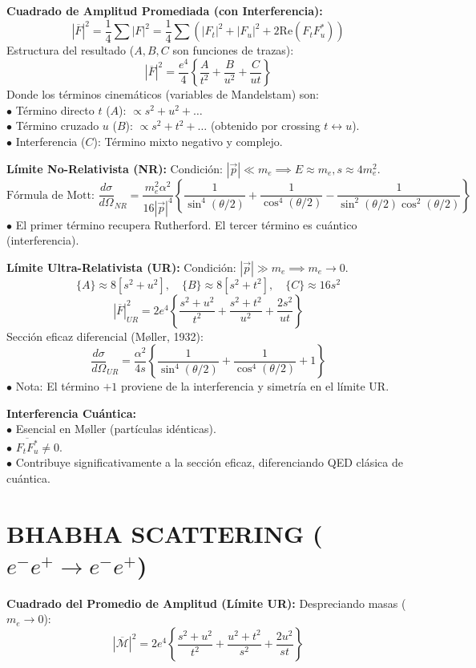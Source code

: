 \textbf{Cuadrado de Amplitud Promediada (con Interferencia):}
$$ |\overline{F}|^2 = \frac{1}{4} \sum |F|^2 = \frac{1}{4} \sum (|F_t|^2 + |F_u|^2 + 2\text{Re}(F_t F_u^*)) $$
Estructura del resultado ($A, B, C$ son funciones de trazas):
$$ |\overline{F}|^2 = \frac{e^4}{4} \left\{ \frac{A}{t^2} + \frac{B}{u^2} + \frac{C}{ut} \right\} $$
Donde los términos cinemáticos (variables de Mandelstam) son:\\
$\bullet$ Término directo $t$ ($A$): $\propto s^2 + u^2 + \dots$\\
$\bullet$ Término cruzado $u$ ($B$): $\propto s^2 + t^2 + \dots$ (obtenido por crossing $t \leftrightarrow u$).\\
$\bullet$ Interferencia ($C$): Término mixto negativo y complejo.

\textbf{Límite No-Relativista (NR):}
Condición: $|\vec{p}| \ll m_e \implies E \approx m_e, s \approx 4m_e^2$.
$$ \text{Fórmula de Mott: }\frac{d\sigma}{d\Omega}_{NR} = \frac{m_e^2 \alpha^2}{16|\vec{p}|^4} \left\{ \frac{1}{\sin^4(\theta/2)} + \frac{1}{\cos^4(\theta/2)} - \frac{1}{\sin^2(\theta/2)\cos^2(\theta/2)} \right\} $$
$\bullet$ El primer término recupera Rutherford. El tercer término es cuántico (interferencia).

\textbf{Límite Ultra-Relativista (UR):}
Condición: $|\vec{p}| \gg m_e \implies m_e \to 0$.
$$ \{A\} \approx 8[s^2+u^2], \quad \{B\} \approx 8[s^2+t^2], \quad \{C\} \approx 16s^2 $$
$$ |\overline{F}|^2_{UR} = 2e^4 \left\{ \frac{s^2+u^2}{t^2} + \frac{s^2+t^2}{u^2} + \frac{2s^2}{ut} \right\} $$
Sección eficaz diferencial (Møller, 1932):
$$ \frac{d\sigma}{d\Omega}_{UR} = \frac{\alpha^2}{4s} \left\{ \frac{1}{\sin^4(\theta/2)} + \frac{1}{\cos^4(\theta/2)} + 1 \right\} $$
$\bullet$ Nota: El término $+1$ proviene de la interferencia y simetría en el límite UR.



\textbf{Interferencia Cuántica:}\\
$\bullet$ Esencial en Møller (partículas idénticas).\\
$\bullet$ $\overline{F_t F_u^*} \neq 0$.\\
$\bullet$ Contribuye significativamente a la sección eficaz, diferenciando QED clásica de cuántica.


\section{BHABHA SCATTERING ($e^- e^+ \to e^- e^+$)}
\textbf{Cuadrado del Promedio de Amplitud (Límite UR):}
Despreciando masas ($m_e \to 0$):\\
$$ |\overline{\mathcal{M}}|^2 = 2e^4 \left\{ \frac{s^2+u^2}{t^2} + \frac{u^2+t^2}{s^2} + \frac{2u^2}{st} \right\} $$

